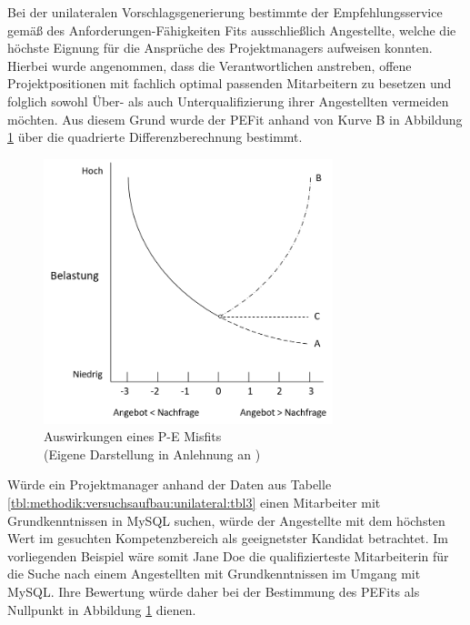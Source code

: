 Bei der unilateralen Vorschlagsgenerierung bestimmte der Empfehlungsservice gemäß des Anforderungen-Fähigkeiten Fits ausschließlich Angestellte, welche die höchste Eignung für die Ansprüche des Projektmanagers aufweisen konnten. Hierbei wurde angenommen, dass die Verantwortlichen anstreben, offene Projektpositionen mit fachlich optimal passenden Mitarbeitern zu besetzen und folglich sowohl Über- als auch Unterqualifizierung ihrer Angestellten vermeiden möchten. Aus diesem Grund wurde der \ac{PEFit} anhand von Kurve B in Abbildung \ref{fig:methodik:versuchsaufbau:unilateral:abb2} über die quadrierte Differenzberechnung bestimmt.

\begin{figure}[h]
	\centering
	\includegraphics[width=0.75\textwidth]{gfx/ueberschuss_supply_motive.png}
	\caption[Auswirkungen eines P-E Misfits]{Auswirkungen eines P-E Misfits\\(Eigene Darstellung in Anlehnung an \cite[S. 23]{edwards:2008})}
	\label{fig:methodik:versuchsaufbau:unilateral:abb2}
\end{figure}

Würde ein Projektmanager anhand der Daten aus Tabelle \ref{tbl:methodik:versuchsaufbau:unilateral:tbl3} einen Mitarbeiter mit Grundkenntnissen in MySQL suchen, würde der Angestellte mit dem höchsten Wert im gesuchten Kompetenzbereich als geeignetster Kandidat betrachtet. Im vorliegenden Beispiel wäre somit Jane Doe die qualifizierteste Mitarbeiterin für die Suche nach einem Angestellten mit Grundkenntnissen im Umgang mit MySQL. Ihre Bewertung würde daher bei der Bestimmung des \acp{PEFit} als Nullpunkt in Abbildung \ref{fig:methodik:versuchsaufbau:unilateral:abb2} dienen.

